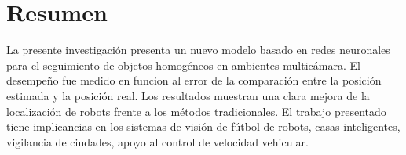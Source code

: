 
\chapter*{Resumen}
La presente investigaci\'on presenta un nuevo modelo basado en redes neuronales  para el seguimiento de objetos homog\'eneos en ambientes multic\'amara. El desempe\~no fue medido en funcion al error de la comparaci\'on entre la posici\'on estimada y la posici\'on real. Los resultados muestran una clara mejora de la localizaci\'on de robots frente a los m\'etodos tradicionales. El trabajo presentado tiene implicancias en los sistemas de visi\'on de f\'utbol de robots, casas inteligentes, vigilancia de ciudades, apoyo al control de velocidad vehicular.
